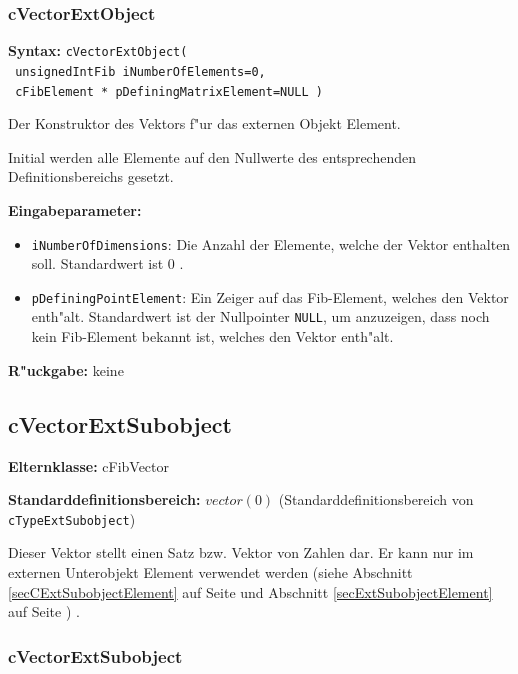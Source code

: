 \subsubsection{cVectorExtObject}

\textbf{Syntax:} \verb|cVectorExtObject(| \\\verb| unsignedIntFib iNumberOfElements=0,| \\\verb| cFibElement * pDefiningMatrixElement=NULL )|

\bigskip\noindent
Der Konstruktor des Vektors f"ur das externen Objekt Element.

Initial werden alle Elemente auf den Nullwerte des entsprechenden Definitionsbereichs gesetzt.

\bigskip\noindent
\textbf{Eingabeparameter:}
\begin{itemize}
 \item \verb|iNumberOfDimensions|: Die Anzahl der Elemente, welche der Vektor enthalten soll. Standardwert ist $0$ .
 \item \verb|pDefiningPointElement|: Ein Zeiger auf das Fib-Element, welches den Vektor enth"alt. Standardwert ist der Nullpointer \verb|NULL|, um anzuzeigen, dass noch kein Fib-Element bekannt ist, welches den Vektor enth"alt.
\end{itemize}

\bigskip\noindent
\textbf{R"uckgabe:} keine


\subsection{cVectorExtSubobject}

\bigskip\noindent
\textbf{Elternklasse:} cFibVector

\bigskip\noindent
\textbf{Standarddefinitionsbereich:} $vector( 0 )$ (Standarddefinitionsbereich von \verb|cTypeExtSubobject|)

\bigskip\noindent
Dieser Vektor stellt einen Satz bzw. Vektor von Zahlen dar. Er kann nur im externen Unterobjekt Element verwendet werden (siehe Abschnitt \ref{secCExtSubobjectElement} auf Seite \pageref{secCExtSubobjectElement} und Abschnitt \ref{secExtSubobjectElement} auf Seite \pageref{secExtSubobjectElement} ) .


\subsubsection{cVectorExtSubobject}

